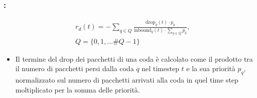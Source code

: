 \documentclass[compress]{beamer}
\begin{document}
\begin{frame}
    \frametitle{\subsecname: \subsubsecname}
    \begin{Definition}
        \begin{equation}
            \label{eq:reward_drop}
            \begin{aligned}
                & r_d(t) = -\sum_{q \in Q}\frac{\text{drop}_q(t) \cdot p_q}{\text{inbound}_q(t) \cdot \sum_{q \in Q}p_q},\\
                & Q = \{0, 1, \dots \#Q - 1\} 
            \end{aligned}
        \end{equation}
    \end{Definition}
    \begin{itemize}
        \item Il termine del drop dei pacchetti di una coda è calcolato come il prodotto tra il numero di pacchetti persi dalla coda $q$ nel 
        timestep $t$ e la sua priorità $p_q$, normalizzato sul numero di pacchetti arrivati alla coda in quel time step moltiplicato per la somma delle priorità.
    \end{itemize}
\end{frame}
\end{document}
